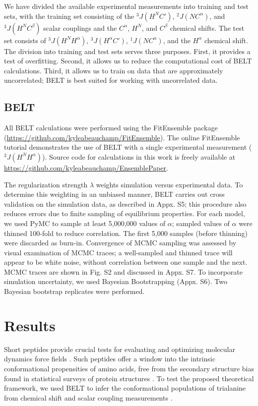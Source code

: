 \documentclass[12pt]{article}
\begin{document}
We have divided the available experimental measurements into training and test sets, with the training set consisting of the $^3J(H^N C')$,  $^2J(N C^\alpha)$, and $^3J(H^N C^\beta)$ scalar couplings and the $C^\alpha$, $H^N$, and $C^\beta$ chemical shifts.  The test set consists of $^3J(H^N H^\alpha)$, $^3J(H^\alpha C')$, $^1J(N C^\alpha)$, and the $H^\alpha$ chemical shift.  The division into training and test sets serves three purposes.  First, it provides a test of overfitting.  Second, it allows us to reduce the computational cost of BELT calculations.  Third, it allows us to train on data that are approximately uncorrelated; BELT is best suited for working with uncorrelated data.  

\subsection*{BELT}

All BELT calculations were performed using the FitEnsemble package (\url{https://github.com/kyleabeauchamp/FitEnsemble}).  The online FitEnsemble tutorial demonstrates the use of BELT with a single experimental measurement ($^3J(H^N H^\alpha)$).  Source code for calculations in this work is freely available at \url{https://github.com/kyleabeauchamp/EnsemblePaper}.  

The regularization strength $\lambda$ weights simulation versus experimental data. To determine this weighting in an unbiased manner, BELT carries out cross validation on the simulation data, as described in Appx. S5; this procedure also reduces errors due to finite sampling of equilibrium properties.  For each model, we used PyMC to sample at least 5,000,000 values of $\alpha$; sampled values of $\alpha$ were thinned 100-fold to reduce correlation.  The first 5,000 samples (before thinning) were discarded as burn-in.  Convergence of MCMC sampling was assessed by visual examination of MCMC traces; a well-sampled and thinned trace will appear to be white noise, without correlation between one sample and the next.  MCMC traces are shown in Fig. S2 and discussed in Appx. S7.  To incorporate simulation uncertainty, we used Bayesian Bootstrapping (Appx. S6).  Two Bayesian bootstrap replicates were performed.  

\section*{Results}

Short peptides provide crucial tests for evaluating and optimizing molecular dynamics force fields  \cite{Graf2007,beauchamp2012protein, nerenberg2011, best2008, Grdadolnik2011}.  Such peptides offer a window into the intrinsic conformational propensities of amino acids, free from the secondary structure bias found in statistical surveys of protein structures  \cite{Jha2005}.  To test the proposed  theoretical framework, we used BELT to infer the conformational populations of trialanine from chemical shift and scalar coupling measurements  \cite{Graf2007}.  
\end{document}
